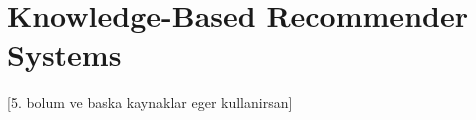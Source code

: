 
\chapter{Knowledge-Based Recommender Systems}\label{chapter:knowledge_based}

[5. bolum ve baska kaynaklar eger kullanirsan]